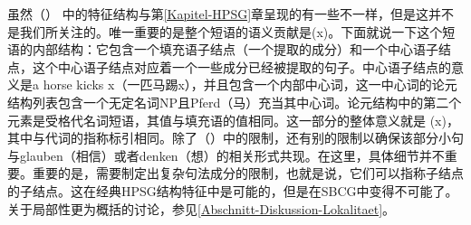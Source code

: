 \begin{figure}
\eanoraggedright
{}
\z
\vspace{-\baselineskip}
\end{figure}%
虽然（） 中的特征结构与第\ref{Kapitel-HPSG}章呈现的有一些不一样，但是这并不是我们所关注的。唯一重要的是整个短语的语义贡献是(x)。下面就说一下这个短语的内部结构：它包含一个填充语子结点（一个提取的成分）和一个中心语子结点，这个中心语子结点对应着一个一些成分已经被提取的句子。中心语子结点的意义是a horse kicks x（一匹马踢x），并且包含一个内部中心词，这一中心词的论元结构列表包含一个无定名词NP且Pferd（马）充当其中心词。论元结构中的第二个元素是受格代名词短语，其\localc 值与填充语的\localc 值相同。这一部分的整体意义就是 (x)，其中与代词的指称标引相同。除了（）中的限制，还有别的限制以确保该部分小句与glauben（相信）或者denken（想）的相关形式共现。在这里，具体细节并不重要。重要的是，需要制定出复杂句法成分的限制，也就是说，它们可以指称子结点的子结点。这在经典HPSG结构特征中是可能的，但是在SBCG中变得不可能了。关于局部性更为概括的讨论，参见\ref{Abschnitt-Diskussion-Lokalitaet}。
